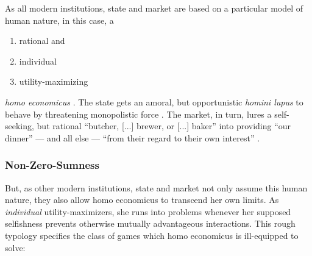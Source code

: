 As all modern institutions, state and market are based on a particular model of human nature, in this case, a
\begin{enumerate}
	\item rational and %
	\item individual 
	\item utility-maximizing %
\end{enumerate}
\emph{homo economicus} \citep[maybe first in][]{Mill1848}. 
The state gets an amoral, but opportunistic \emph{homini lupus} to behave by threatening monopolistic force \citep[as in][]{Hobbes-1651-aa}. 
The market, in turn, lures a self-seeking, but rational ``butcher, [...] brewer, or [...] baker'' into providing ``our dinner'' --- and all else --- ``from their regard to their own interest'' \citep{Smith-1776-lq}. 

\subsubsection[Nonzero]{Non-Zero-Sumness \label{sec:nonzero}}
But, as other modern institutions, state and market not only assume this human nature, they also allow homo economicus to transcend her own limits. 
As \emph{individual} utility-maximizers, she runs into problems whenever her supposed selfishness prevents otherwise mutually advantageous interactions. 
This rough typology specifies the class of games which homo economicus is ill-equipped to solve:

